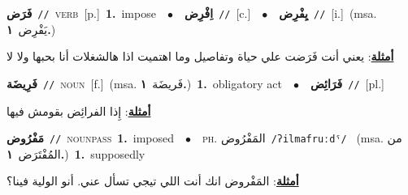 \documentclass[10pt,a4paper,twoside]{article} %
\begin{document}
\begin{multicols}{2}
{\setlength\topsep{0pt}\textbf{\foreignlanguage{arabic}{فَرَض}}\ {\color{gray}\texttt{//}\color{black}}\ \textsc{verb}\ [p.]\ \textbf{1.}~impose\ \ $\bullet$\ \ \setlength\topsep{0pt}\textbf{\foreignlanguage{arabic}{اِفْرِض}}\ {\color{gray}\texttt{//}\color{black}}\ [c.]\ \ $\bullet$\ \ \setlength\topsep{0pt}\textbf{\foreignlanguage{arabic}{يِفْرِض}}\ {\color{gray}\texttt{//}\color{black}}\ [i.]\ \color{gray}(msa. \foreignlanguage{arabic}{يَفْرِض}~\foreignlanguage{arabic}{\textbf{١.}})\color{black}\  \begin{flushright}\color{gray}\foreignlanguage{arabic}{\textbf{\underline{\foreignlanguage{arabic}{أمثلة}}}: يعني أنت فَرَضت علي حياة وتفاصيل وما اهتميت اذا هالشغلات أنا بحبها ولا لا}\end{flushright}\color{black}} \vspace{2mm}

{\setlength\topsep{0pt}\textbf{\foreignlanguage{arabic}{فَرِيضَة}}\ {\color{gray}\texttt{//}\color{black}}\ \textsc{noun}\ [f.]\ \color{gray}(msa. \foreignlanguage{arabic}{فَريضَة}~\foreignlanguage{arabic}{\textbf{١.}})\color{black}\ \textbf{1.}~obligatory act\ \ $\bullet$\ \ \setlength\topsep{0pt}\textbf{\foreignlanguage{arabic}{فَرَائِض}}\ {\color{gray}\texttt{//}\color{black}}\ [pl.]\  \begin{flushright}\color{gray}\foreignlanguage{arabic}{\textbf{\underline{\foreignlanguage{arabic}{أمثلة}}}: إِذا الفرائِض بقومش فيها}\end{flushright}\color{black}} \vspace{2mm}

{\setlength\topsep{0pt}\textbf{\foreignlanguage{arabic}{مَفْرُوض}}\ {\color{gray}\texttt{//}\color{black}}\ \textsc{noun\textunderscore pass}\ \textbf{1.}~imposed\ \ $\bullet$\ \ \textsc{ph.} \color{gray} \foreignlanguage{arabic}{المَفْرُوض}\color{black}\ {\color{gray}\texttt{/{\sffamily ʔilmafruːdˤ}/}\color{black}}\ \color{gray} (msa. \foreignlanguage{arabic}{من المُفْتَرَض}~\foreignlanguage{arabic}{\textbf{١.}})\color{black}\ \textbf{1.}~supposedly\  \begin{flushright}\color{gray}\foreignlanguage{arabic}{\textbf{\underline{\foreignlanguage{arabic}{أمثلة}}}: المَفْروض انك أنت اللي تيجي تسأل عني. أنو الولية فينا؟}\end{flushright}\color{black}} \vspace{2mm}


\end{multicols}
\end{document}
